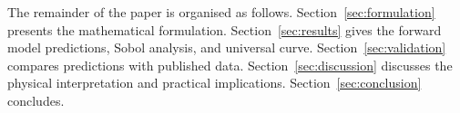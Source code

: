 The remainder of the paper is organised as follows.
Section~\ref{sec:formulation} presents the mathematical formulation.
Section~\ref{sec:results} gives the forward model predictions, Sobol
analysis, and universal curve.  Section~\ref{sec:validation} compares
predictions with published data.  Section~\ref{sec:discussion}
discusses the physical interpretation and practical implications.
Section~\ref{sec:conclusion} concludes.
